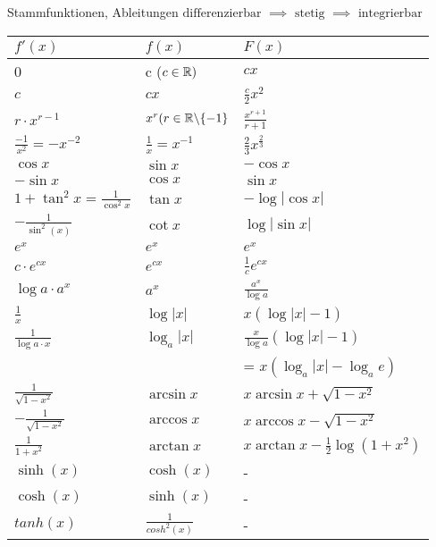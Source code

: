 \begin{Rechenregeln}{Stammfunktionen, Ableitungen}{}
    $\text{differenzierbar }\implies\text{ stetig }\implies \text{ integrierbar}$\\
    \begin{tabular}{l|l|l}
    $f'(x)$ & $f(x)$ & $F(x)$ \\[0.5em] \hline
    0 & c ($c\in\mathbb{R})$ & $cx$ \\[0.5em]
    $c$ & $cx$ &$\frac{c}{2}x^2$ \\[0.5em]
    $r\cdot x^{r-1}$ & $x^r (r\in \mathbb{R} \backslash \{-1\}$ & $\frac{x^{r+1}}{r+1}$ \\[0.5em]
    $\frac{-1}{x^2} = -x^{-2}$ & $\frac{1}{x}=x^{-1}$ & $\frac{2}{3}x^{\frac{2}{3}}$ \\[0.5em]
    $\cos x$ & $\sin x$  & $-\cos x$ \\[0.5em]
    $-\sin x$ & $\cos x$ & $\sin x$\\[0.5em]
    $1+\tan^2x = \frac{1}{\cos^2x}$ & $\tan x$ & $-\log|\cos x|$\\[0.5em]
    $-\frac{1}{\sin^2(x)}$ & $\cot x$ & $\log|\sin x|$\\[0.5em]
    $e^x$ & $e^x$ & $e^x$\\[0.5em]
    $c\cdot e^{cx}$ & $e^{cx}$ & $\frac{1}{c}e^{cx}$\\[0.5em]
    $\log a \cdot a^x$ & $a^x$ & $\frac{a^x}{\log a}$\\[0.5em]
    $\frac{1}{x}$ & $\log|x|$ & $x(\log|x|-1)$ \\[0.5em]
    $\frac{1}{\log a\cdot x}$ & $\log_a |x|$ & $\frac{x}{\log a}(\log|x|-1)$\\[0.5em]
     & & = $x(\log_a|x|-\log_ae)$\\[0.5em]
    $\frac{1}{\sqrt{1-x^2}}$ & $\arcsin x$ & $x\arcsin x + \sqrt{1-x^2}$\\[0.5em]
    $-\frac{1}{\sqrt{1-x^2}}$ & $\arccos x$ &  $x\arccos x - \sqrt{1-x^2}$\\[0.5em]
    $\frac{1}{1+x^2}$ & $\arctan x$ & $x\arctan x - \frac{1}{2}\log(1+x^2)$\\
    $\sinh(x)$ & $\cosh(x)$ & - \\
    $\cosh(x)$ & $\sinh(x)$ & -\\
    $tanh(x)$ & $\frac{1}{cosh^2(x)}$ & -
    \end{tabular}
\end{Rechenregeln}
